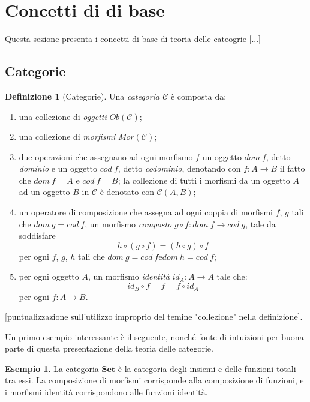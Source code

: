 \documentclass{article}
\theoremstyle{definition}
\newtheorem{definition}{Definizione}
\theoremstyle{definition}
\newtheorem{example}{Esempio}
\newcommand{\id}[1]{id_{#1}}
\begin{document}
\section{Concetti di di base}

Questa sezione presenta i concetti di base di teoria delle cateogrie [...] 

\subsection{Categorie}

	\begin{definition}[Categorie]
		Una \emph{categoria $\mathcal{C}$} è composta da:
		\begin{enumerate}
			\item una collezione di \emph{oggetti} $Ob(\mathcal{C})$;
			\item una collezione di \emph{morfismi} $Mor(\mathcal{C})$;
			\item due operazioni che assegnano ad ogni morfismo $f$ un oggetto $dom\ f$, detto \emph{dominio} e un oggetto $cod\ f$, detto \emph{codominio}, denotando con $f: A \rightarrow B$ il fatto che $dom\ f = A \text{ e } cod\ f = B$; la collezione di tutti i morfismi da un oggetto $A$ ad un oggetto $B$ in $\mathcal{C}$ è denotato con $\mathcal{C}(A, B)$;
			\item un operatore di composizione che assegna ad ogni coppia di morfismi $f$, $g$ tali che $dom\ g = cod\ f$, un morfismo \emph{composto} $g \circ f: dom\ f \rightarrow cod\ g$, tale da soddisfare
				\[
					h \circ (g \circ f) = (h \circ g) \circ f
				\]
				per ogni $f$, $g$, $h$ tali che $dom\ g = cod\ f \text{e} dom\ h = cod\ f$;
			\item per ogni oggetto $A$, un morfismo \emph{identità} $\id{A}: A \rightarrow A$ tale che:
				\[
					\id{B} \circ f = f = f \circ \id{A}
				\]
				per ogni $f: A \rightarrow B$.
		\end{enumerate}
	\end{definition}

	[puntualizzazione sull'utilizzo improprio del temine "collezione" nella definizione].
	
	Un primo esempio interessante è il seguente, nonché fonte di intuizioni per buona parte di questa presentazione della teoria delle categorie.

	\begin{example}
		La categoria $\textbf{Set}$ è la categoria degli insiemi e delle funzioni totali tra essi. La composizione di morfismi corrisponde alla composizione di funzioni, e i morfismi identità corrispondono alle funzioni identità.
	\end{example}
\end{document}
